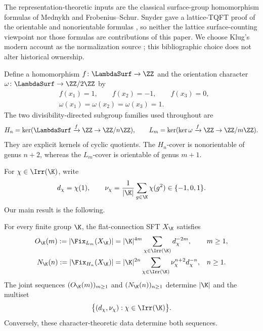 The representation-theoretic inputs are the classical surface-group
homomorphism formulas of Mednykh and Frobenius--Schur.  Snyder gave a
lattice-TQFT proof of the orientable and nonorientable formulas
\cite{Snyder2007}, so neither the lattice surface-counting viewpoint nor those
formulas are contributions of this paper.  We choose Klug's modern account as
the normalization source \cite{Klug2025}; this bibliographic choice does not
alter historical ownership.

Define a homomorphism $f\colon\LambdaSurf\to\ZZ$ and the orientation
character $\omega\colon\LambdaSurf\to\ZZ/2\ZZ$ by
\begin{equation}
 \begin{aligned}
 &f(x_1)=1,\qquad f(x_2)=-1,\qquad f(x_3)=0,\\
 &\omega(x_1)=\omega(x_2)=\omega(x_3)=1.
 \end{aligned}
 \label{eq:f-and-omega}
\end{equation}
The two divisibility-directed subgroup families used throughout are
\begin{equation}
 H_n=\ker(\LambdaSurf\xrightarrow{f}\ZZ\to\ZZ/n\ZZ),
 \qquad
 L_m=\ker(\ker\omega\xrightarrow{f}\ZZ\to\ZZ/m\ZZ).
 \label{eq:two-families}
\end{equation}
They are explicit kernels of cyclic quotients.  The $H_n$-cover is
nonorientable of genus $n+2$, whereas the $L_m$-cover is orientable of genus
$m+1$.

For $\chi\in\Irr(\K)$, write
\[
 d_\chi=\chi(1),\qquad
 \nu_\chi=\frac{1}{|\K|}\sum_{g\in\K}\chi(g^2)
 \in\{-1,0,1\}.
\]
Our main result is the following.

\begin{theorem}
\label{thm:main}
For every finite group $\K$, the flat-connection SFT $X_{\K}$ satisfies
\begin{align}
 O_{\K}(m)
  :=|\Fix_{L_m}(X_{\K})|
  &=|\K|^{4m}\sum_{\chi\in\Irr(\K)}d_\chi^{-2m},
  &&m\geq1,
 \label{eq:intro-orientable}\\
 N_{\K}(n)
  :=|\Fix_{H_n}(X_{\K})|
  &=|\K|^{2n}\sum_{\chi\in\Irr(\K)}
       \nu_\chi^{n+2}d_\chi^{-n},
  &&n\geq1.
 \label{eq:intro-nonorientable}
\end{align}
The joint sequences $(O_{\K}(m))_{m\geq1}$ and
$(N_{\K}(n))_{n\geq1}$ determine $|\K|$ and the multiset
\[
 \bigl\{(d_\chi,\nu_\chi):\chi\in\Irr(\K)\bigr\}.
\]
Conversely, these character-theoretic data determine both sequences.
\end{theorem}

